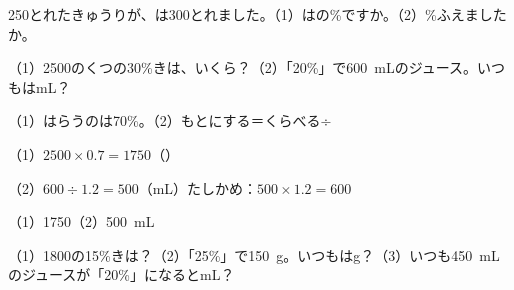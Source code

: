 \begin{jibun}
250とれたきゅうりが、は300とれました。（1）はの\%ですか。（2）\%ふえましたか。
\end{jibun}

\begin{reidai}
（1）2500のくつの30\%きは、いくら？（2）「20\%」で\qty{600}{mL}のジュース。いつもはmL？\par
\kangaekata（1）はらうのは70\%。（2）もとにする＝くらべる÷\par
\shiki（1）$2500\times0.7=1750$（）\par
\hspace*{2.6\zw}（2）$600\div1.2=500$（mL）\quad たしかめ：$500\times1.2=600$\par
\kotae（1）1750\quad（2）\qty{500}{mL}
\end{reidai}

\begin{jibun}
（1）1800の15\%きは？（2）「25\%」で\qty{150}{g}。いつもはg？（3）いつも\qty{450}{mL}のジュースが「20\%」になるとmL？
\end{jibun}

